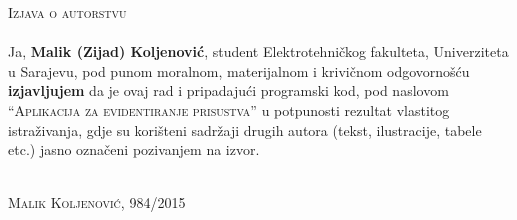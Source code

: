 \begin{center}
    \textsc{\LARGE Izjava o autorstvu}
\end{center}
\vfill
\paragraph*{}
Ja, \textbf{Malik (Zijad) Koljenović}, student Elektrotehničkog fakulteta, Univerziteta u Sarajevu, pod punom moralnom, materijalnom i krivičnom odgovornošću \textbf{izjavljujem} da je ovaj rad i pripadajući programski kod, pod naslovom \textsc{``Aplikacija za evidentiranje prisustva''} u potpunosti rezultat vlastitog istraživanja, gdje su korišteni sadržaji drugih autora (tekst, ilustracije, tabele etc.) jasno označeni pozivanjem na izvor.

\vfill

\noindent
\begin{flushright}
    \hspace{0.5cm} \makebox[2in]{\hrulefill} \\
    \textsc{Malik Koljenović, 984/2015}
\end{flushright}
\clearpage